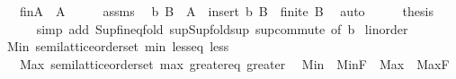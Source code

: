 \begin{isabellebody}
\ \ \ {\isachardoublequoteopen}{\isasymSqunion}\isactrlsub f\isactrlsub i\isactrlsub nA\ {\isacharequal}{\kern0pt}\ {\isasymSqunion}A{\isachardoublequoteclose}\isanewline
%
\isadelimproof
%
\endisadelimproof
%
\isatagproof
{}\isamarkupfalse%
\ {\isacharminus}{\kern0pt}\isanewline
\ \ \isamarkupfalse%
\ assms\ \isamarkupfalse%
\ b\ B\ \ {\isachardoublequoteopen}A\ {\isacharequal}{\kern0pt}\ insert\ b\ B{\isachardoublequoteclose}\ \ {\isachardoublequoteopen}finite\ B{\isachardoublequoteclose}\ \isamarkupfalse%
\ auto\isanewline
\ \ \isamarkupfalse%
\ \isamarkupfalse%
\ {\isacharquery}{\kern0pt}thesis\isanewline
\ \ \ \ \isamarkupfalse%
\ {\isacharparenleft}{\kern0pt}simp\ add{\isacharcolon}{\kern0pt}\ Sup{\isacharunderscore}{\kern0pt}fin{\isachardot}{\kern0pt}eq{\isacharunderscore}{\kern0pt}fold\ sup{\isacharunderscore}{\kern0pt}Sup{\isacharunderscore}{\kern0pt}fold{\isacharunderscore}{\kern0pt}sup\ sup{\isachardot}{\kern0pt}commute\ {\isacharbrackleft}{\kern0pt}of\ b{\isacharbrackright}{\kern0pt}{\isacharparenright}{\kern0pt}\isanewline
{}\isamarkupfalse%
%
\endisatagproof
{\isafoldproof}%
%
\isadelimproof
\isanewline
%
\endisadelimproof
\isanewline
{}\isamarkupfalse%
%
\isadelimdocument
%
\endisadelimdocument
%
\isatagdocument
%
\isamarkuptrue%
%
\endisatagdocument
{\isafolddocument}%
%
\isadelimdocument
%
\endisadelimdocument
{}\isamarkupfalse%
\ linorder\isanewline
{}\isanewline
\isanewline
{}\isamarkupfalse%
\ Min{\isacharcolon}{\kern0pt}\ semilattice{\isacharunderscore}{\kern0pt}order{\isacharunderscore}{\kern0pt}set\ min\ less{\isacharunderscore}{\kern0pt}eq\ less\isanewline
\ \ {\isacharplus}{\kern0pt}\ Max{\isacharcolon}{\kern0pt}\ semilattice{\isacharunderscore}{\kern0pt}order{\isacharunderscore}{\kern0pt}set\ max\ greater{\isacharunderscore}{\kern0pt}eq\ greater\isanewline
{}\isanewline
\ \ Min\ {\isacharequal}{\kern0pt}\ Min{\isachardot}{\kern0pt}F\ \ Max\ {\isacharequal}{\kern0pt}\ Max{\isachardot}{\kern0pt}F%
\isadelimproof
\ %
\endisadelimproof
%
\isatagproof
\isacommand{{\isachardot}{\kern0pt}{\isachardot}{\kern0pt}}\isamarkupfalse%
%
\endisatagproof
{\isafoldproof}%
%
\isadelimproof
%
\endisadelimproof
\isanewline
\isanewline
{}\isamarkupfalse%
\isanewline
\isanewline
{}\isamarkupfalse%

\end{isabellebody}

